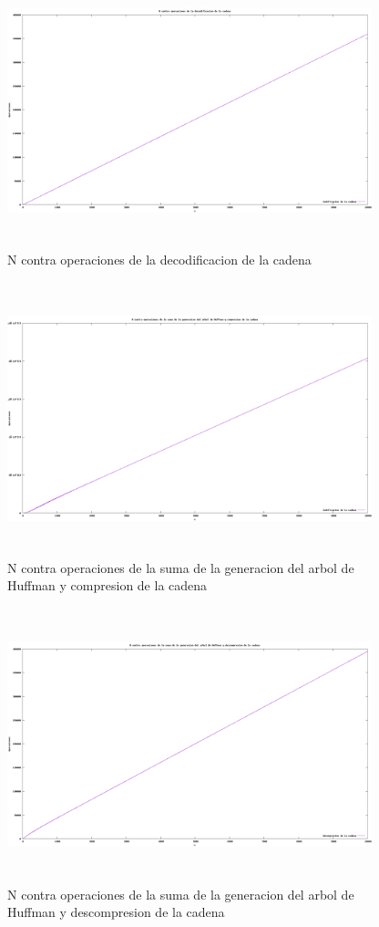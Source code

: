 \documentclass[spanish]{article}
\begin{document}
	\begin{figure}[H]
		\centering
		\includegraphics[width=400px,height=300px]{grafica3}
		\caption{N contra operaciones de la decodificacion de la cadena}
	\end{figure}
	\begin{figure}[H]
		\centering
		\includegraphics[width=400px,height=300px]{grafica4}
		\caption{N contra operaciones de la suma de la generacion del arbol de Huffman y compresion de la cadena}
	\end{figure}
	\begin{figure}[H]
		\centering
		\includegraphics[width=400px,height=300px]{grafica5}
		\caption{N contra operaciones de la suma de la generacion del arbol de Huffman y descompresion de la cadena}
	\end{figure}
\end{document}
